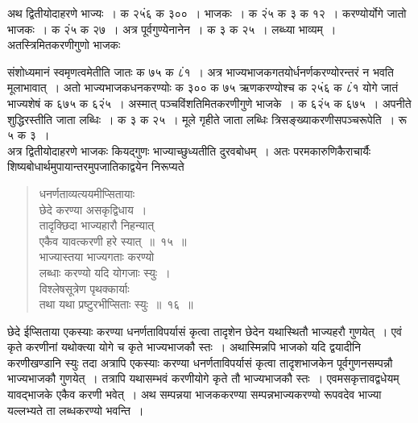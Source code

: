 \documentclass[11pt, openany]{book}
\begin{document}
\vspace{-3mm}
 अथ द्वितीयोदाहरणे भाज्यः~। क २५ं६ क ३००~। भाजकः~। क २ं५ 
क ३ क १२~। करण्योर्योगे जातो भाजकः~। क २ं५ क २७~। अत्र 
पूर्वगुण्येनानेन~। क ३ क २५~। लब्ध्या भाव्यम्~। अतस्त्रिमितकरणीगुणो भाजकः
\newpage

\noindent संशोध्यमानं स्वमृणत्वमेतीति जातः क ७५ क ८ं१~। अत्र भाज्यभाजकगतयोर्धनर्णकरण्योरन्तरं न भवति मूलाभावात्~। अतो भाज्यभाजकधनकरण्योः क ३०० क ७५ ऋणकरण्योश्च क २५ं६ क ८ं१ योगे जातं भाज्यशेषं क ६७५ क ६२ं५~। अस्मात् पञ्चविंशतिमितकरणीगुणे भाजके~। क ६२ं५ 
क ६७५~। अपनीते शुद्धिरस्तीति जाता लब्धिः~। क ३ क २५~। 
मूले गृहीते जाता लब्धिः त्रिसङ्ख्याकरणीसपञ्चरूपेति~। रू ५ क ३~। \\

\vspace{-3mm}
 अत्र द्वितीयोदाहरणे भाजकः कियद्गुणः भाज्याच्छुध्यतीति दुरवबोधम्~। 
अतः परमकारुणिकैराचार्यैः शिष्यबोधार्थमुपायान्तरमुपजातिकाद्वयेन
निरूप्यते\textendash 
\begin{quote}
    \bs
     धनर्णताव्यत्ययमीप्सितायाः\\

\vspace{-7mm}
\hspace{1cm} छेदे करण्या असकृद्विधाय~। \\

 \vspace{-7mm}
 तादृक्छिदा भाज्यहारौ निहन्यात्\\

\vspace{-7mm}
\hspace{1cm} एकैव यावत्करणी हरे स्यात्~॥~१५~॥\\
 
 \vspace{-4mm}
 भाज्यास्तया भाज्यगताः करण्यो \\

\vspace{-7mm}
\hspace{1cm} लब्धाः करण्यो यदि योगजाः स्युः~। \\

 \vspace{-7mm}
 विश्लेषसूत्रेण पृथक्कार्याः \\

\vspace{-7mm}
\hspace{1cm} तथा यथा प्रष्टुरभीप्सिताः स्युः~॥~१६~॥
\end{quote}


 छेदे ईप्सिताया एकस्याः करण्या धनर्णताविपर्यासं कृत्वा तादृशेन 
छेदेन यथास्थितौ भाज्यहरौ गुणयेत्~। एवं कृते करणीनां यथोक्त्या 
योगे च कृते भाज्यभाजकौ स्तः~। अथास्मिन्नपि भाजको यदि द्वयादीनि 
करणीखण्डानि स्युः तदा अत्रापि एकस्याः करण्या धनर्णताविपर्यासं कृत्वा 
तादृशभाजकेन पूर्वगुणनसम्पन्नौ भाज्यभाजकौ गुणयेत्~। तत्रापि यथासम्भवं 
करणीयोगे कृते तौ भाज्यभाजकौ स्तः~। एवमसकृत्तावद्वधेयम् यावद्भाजके 
एकैव करणी भवेत्~। अथ सम्पन्नया भाजककरण्या सम्पन्नभाज्यकरण्यो 
रूपवदेव भाज्या यल्लभ्यते ता लब्धकरण्यो भवन्ति~।
\newpage
\end{document}
